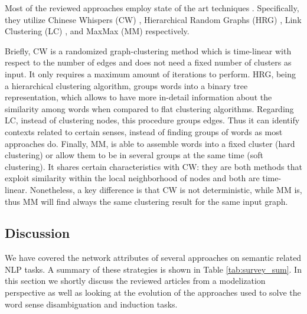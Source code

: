 Most of the reviewed approaches employ state of the art techniques \cite{2008.Klapaftis.WSIUsingCollocations,2010.Klapaftis.WSD.WSD.HierarchicalGraphs,2011.Jurgens.WSICommunityDetection,2013.Hope.GradedWSI}. Specifically, they utilize Chinese Whispers (CW) \cite{biemann2006chinese}, Hierarchical Random Graphs (HRG) \cite{clauset2008hierarchical}, Link Clustering (LC) \cite{ahn2010link}, and MaxMax (MM) \cite{hope2013maxmax} respectively. 

Briefly, CW is a randomized graph-clustering method  which is time-linear with respect to the number of edges and does not need a fixed number of clusters as input. It only requires a maximum amount of iterations to perform. HRG, being a hierarchical clustering algorithm, groups words into a binary tree representation, which allows to have more in-detail information about the similarity among words when compared to flat clustering algorithms. Regarding LC, instead of clustering nodes, this procedure groups edges. Thus it can identify contexts related to certain senses, instead of finding groups of words as most approaches do. Finally, MM, is able to assemble words into a fixed cluster (hard clustering) or allow them to be in several groups at the same time (soft clustering). It shares certain characteristics with CW:  they are both methods that exploit similarity within the local neighborhood of nodes and both are time-linear. Nonetheless, a key difference is that CW is not deterministic, while MM is, thus MM will find always the same clustering result for the same input graph.

 
 



\subsection{Discussion}\label{sec:disc_chap3}
We have covered the network attributes of several approaches on semantic related NLP tasks. A summary of these strategies is shown in Table \ref{tab:survey_sum}.
In this section we shortly discuss the reviewed articles from a  modelization perspective as well as looking at the evolution of the approaches used to solve the word sense disambiguation and induction tasks.


